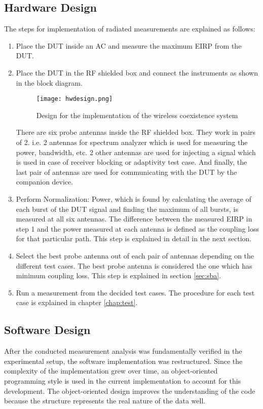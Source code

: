 \subsection{Hardware Design}
The steps for implementation of radiated measurements are explained as follows:
\begin{enumerate}
  \item Place the \acs{DUT} inside an \acf{AC} and measure the maximum \acs{EIRP} from the \acs{DUT}.
  \item Place the \acs{DUT} in the \acs{RF} shielded box and connect the instruments as shown in the block diagram.

\begin{figure}[H]
\centering
\texttt{[image: hwdesign.png]}
\caption{Design for the implementation of the wireless coexistence system}
\label{fig:3} 
\end{figure}

There are six probe antennas inside the \acs{RF} shielded box. They work in pairs of 2. i.e. 2 antennas for spectrum analyzer which is used for measuring the power, bandwidth, etc. 2 other antennas are used for injecting a signal which is used in case of receiver blocking or adaptivity test case. And finally, the last pair of antennas are used for communicating with the \acs{DUT} by the companion device.

\item Perform Normalization: Power, which is found by calculating the average of each burst of the \acs{DUT} signal and finding the maximum of all bursts, is measured at all six antennas. The difference between the measured \acs{EIRP} in step 1 and the power measured at each antenna is defined as the coupling loss for that particular path. This step is explained in detail in the next section.

\item Select the best probe antenna out of each pair of antennas depending on the different test cases. The best probe antenna is considered the one which has minimum coupling loss. This step is explained in section \ref{sec:sba}. 

\item Run a measurement from the decided test cases. The procedure for each test case is explained in chapter \ref{chap:test}.

\end{enumerate}



\subsection{Software Design}
After the conducted measurement analysis was fundamentally verified in the experimental setup, the software implementation was restructured. Since the complexity of the implementation grew over time, an object-oriented programming style is used in the current implementation to account for this development. The object-oriented design improves the understanding of the code because the structure represents the real nature of the data well.

